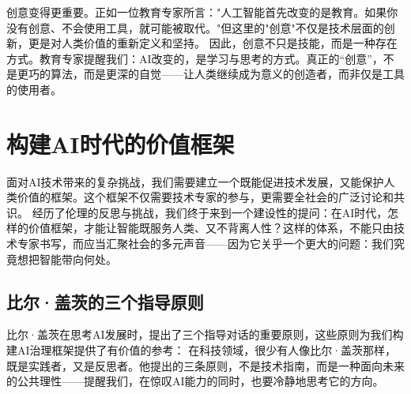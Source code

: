 创意变得更重要。正如一位教育专家所言："人工智能首先改变的是教育。如果你没有创意、不会使用工具，就可能被取代。"但这里的"创意"不仅是技术层面的创新，更是对人类价值的重新定义和坚持。
因此，创意不只是技能，而是一种存在方式。教育专家提醒我们：AI改变的，是学习与思考的方式。真正的“创意”，不是更巧的算法，而是更深的自觉——让人类继续成为意义的创造者，而非仅是工具的使用者。

\section{构建AI时代的价值框架}

面对AI技术带来的复杂挑战，我们需要建立一个既能促进技术发展，又能保护人类价值的框架。这个框架不仅需要技术专家的参与，更需要全社会的广泛讨论和共识。
经历了伦理的反思与挑战，我们终于来到一个建设性的提问：在AI时代，怎样的价值框架，才能让智能既服务人类、又不背离人性？这样的体系，不能只由技术专家书写，而应当汇聚社会的多元声音——因为它关乎一个更大的问题：我们究竟想把智能带向何处。

\subsection{比尔·盖茨的三个指导原则}

比尔·盖茨在思考AI发展时，提出了三个指导对话的重要原则，这些原则为我们构建AI治理框架提供了有价值的参考：
在科技领域，很少有人像比尔·盖茨那样，既是实践者，又是反思者。他提出的三条原则，不是技术指南，而是一种面向未来的公共理性——提醒我们，在惊叹AI能力的同时，也要冷静地思考它的方向。

